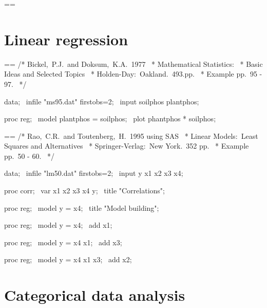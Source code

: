 \documentclass{book}
\makeatletter
\newenvironment{Texinfopreformatted}{%
  \par\GNUTobeylines\obeyspaces\frenchspacing\parskip=\z@\parindent=\z@}{}
{\catcode`\^^M=13 \gdef\GNUTobeylines{\catcode`\^^M=13 \def^^M{\null\par}}}
\newenvironment{Texinfoindented}{\begin{list}{}{}\item\relax}{\end{list}}
\renewcommand{\_}{\Texinfounderscore\discretionary{}{}{}}
\makeatother
\begin{document}
\begin{Texinfoindented}
\begin{Texinfopreformatted}
\end{Texinfopreformatted}
\end{Texinfoindented}


\section{{Linear regression}}
\label{anchor:Linear-regression-examples}%
%
%

\begin{Texinfoindented}
\begin{Texinfopreformatted}%
\ttfamily /* Bickel,\ P.J.\ and Doksum,\ K.A.\ 1977
\ * Mathematical Statistics:
\ * Basic Ideas and Selected Topics
\ * Holden-Day:\ Oakland.\ 493.pp.
\ * Example pp.\ 95 - 97.
\ */

data;
\  infile "ms95.dat" firstobs=2;
\  input soilphos plantphos;

proc reg;
\ model plantphos = soilphos;
\ plot phantphos * soilphos;


\end{Texinfopreformatted}
\end{Texinfoindented}

\begin{Texinfoindented}
\begin{Texinfopreformatted}%
\ttfamily /* Rao,\ C.R.\ and Toutenberg,\ H.\ 1995 using SAS
\ * Linear Models:\ Least Squares and Alternatives
\ * Springer-Verlag:\ New York.\ 352 pp.
\ * Example pp.\ 50 - 60.
\ */

data;
\  infile "lm50.dat" firstobs=2;
\  input y x1 x2 x3 x4;

proc corr;
\ var x1 x2 x3 x4 y;
\ title "Correlations";

proc reg;
\ model y = x4;
\ title "Model building";

proc reg;
\ model y = x4;
\ add x1;

proc reg;
\ model y = x4 x1;
\ add x3;

proc reg;
\ model y = x4 x1 x3;
\ add x2;

\end{Texinfopreformatted}
\end{Texinfoindented}

\section{{Categorical data analysis}}
\label{anchor:Categorical-data-analysis-examples}%
%
%
%
%
%
%
%
%
\end{document}
